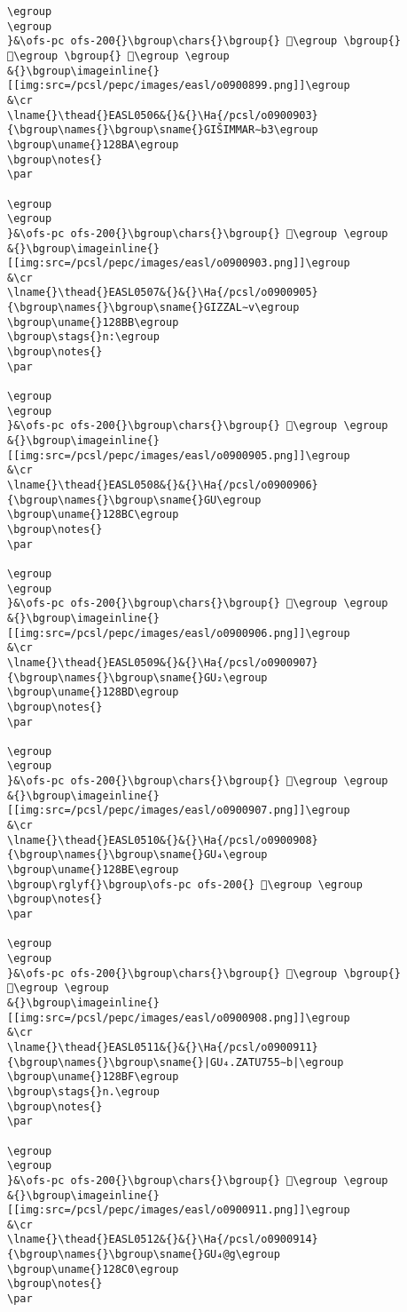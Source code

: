 \begin{verbatim}
\egroup
\egroup
}&\ofs-pc ofs-200{}\bgroup\chars{}\bgroup{} 𒢷\egroup \bgroup{} 𒢸\egroup \bgroup{} 𒢹\egroup \egroup
&{}\bgroup\imageinline{}[[img:src=/pcsl/pepc/images/easl/o0900899.png]]\egroup
&\cr
\lname{}\thead{}EASL0506&{}&{}\Ha{/pcsl/o0900903}{\bgroup\names{}\bgroup\sname{}GIŠIMMAR∼b3\egroup
\bgroup\uname{}128BA\egroup
\bgroup\notes{}
\par 

\egroup
\egroup
}&\ofs-pc ofs-200{}\bgroup\chars{}\bgroup{} 𒢺\egroup \egroup
&{}\bgroup\imageinline{}[[img:src=/pcsl/pepc/images/easl/o0900903.png]]\egroup
&\cr
\lname{}\thead{}EASL0507&{}&{}\Ha{/pcsl/o0900905}{\bgroup\names{}\bgroup\sname{}GIZZAL∼v\egroup
\bgroup\uname{}128BB\egroup
\bgroup\stags{}n:\egroup
\bgroup\notes{}
\par 

\egroup
\egroup
}&\ofs-pc ofs-200{}\bgroup\chars{}\bgroup{} 𒢻\egroup \egroup
&{}\bgroup\imageinline{}[[img:src=/pcsl/pepc/images/easl/o0900905.png]]\egroup
&\cr
\lname{}\thead{}EASL0508&{}&{}\Ha{/pcsl/o0900906}{\bgroup\names{}\bgroup\sname{}GU\egroup
\bgroup\uname{}128BC\egroup
\bgroup\notes{}
\par 

\egroup
\egroup
}&\ofs-pc ofs-200{}\bgroup\chars{}\bgroup{} 𒢼\egroup \egroup
&{}\bgroup\imageinline{}[[img:src=/pcsl/pepc/images/easl/o0900906.png]]\egroup
&\cr
\lname{}\thead{}EASL0509&{}&{}\Ha{/pcsl/o0900907}{\bgroup\names{}\bgroup\sname{}GU₂\egroup
\bgroup\uname{}128BD\egroup
\bgroup\notes{}
\par 

\egroup
\egroup
}&\ofs-pc ofs-200{}\bgroup\chars{}\bgroup{} 𒢽\egroup \egroup
&{}\bgroup\imageinline{}[[img:src=/pcsl/pepc/images/easl/o0900907.png]]\egroup
&\cr
\lname{}\thead{}EASL0510&{}&{}\Ha{/pcsl/o0900908}{\bgroup\names{}\bgroup\sname{}GU₄\egroup
\bgroup\uname{}128BE\egroup
\bgroup\rglyf{}\bgroup\ofs-pc ofs-200{} 𒢾\egroup \egroup
\bgroup\notes{}
\par 

\egroup
\egroup
}&\ofs-pc ofs-200{}\bgroup\chars{}\bgroup{} 𒣁\egroup \bgroup{} 𒢾\egroup \egroup
&{}\bgroup\imageinline{}[[img:src=/pcsl/pepc/images/easl/o0900908.png]]\egroup
&\cr
\lname{}\thead{}EASL0511&{}&{}\Ha{/pcsl/o0900911}{\bgroup\names{}\bgroup\sname{}|GU₄.ZATU755∼b|\egroup
\bgroup\uname{}128BF\egroup
\bgroup\stags{}n.\egroup
\bgroup\notes{}
\par 

\egroup
\egroup
}&\ofs-pc ofs-200{}\bgroup\chars{}\bgroup{} 𒢿\egroup \egroup
&{}\bgroup\imageinline{}[[img:src=/pcsl/pepc/images/easl/o0900911.png]]\egroup
&\cr
\lname{}\thead{}EASL0512&{}&{}\Ha{/pcsl/o0900914}{\bgroup\names{}\bgroup\sname{}GU₄@g\egroup
\bgroup\uname{}128C0\egroup
\bgroup\notes{}
\par 


\end{verbatim}
